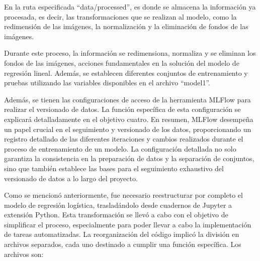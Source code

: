 En la ruta especificada ``data/processed'', es donde se almacena la información ya procesada, es decir, las transformaciones que se realizan al modelo, como la redimensión de las imágenes, la normalización y la eliminación de fondos de las imágenes.

\newpage

Durante este proceso, la información se redimensiona, normaliza y se eliminan los fondos de las imágenes, acciones fundamentales en la solución del modelo de regresión lineal. Además, se establecen diferentes conjuntos de entrenamiento y pruebas utilizando las variables disponibles en el archivo ``model1''. \newline

Además, se tienen las configuraciones de acceso de la herramienta MLFlow para realizar el versionado de datos. La función específica de esta configuración se explicará detalladamente en el objetivo cuatro. En resumen, MLFlow desempeña un papel crucial en el seguimiento y versionado de los datos, proporcionando un registro detallado de las diferentes iteraciones y cambios realizados durante el proceso de entrenamiento de un modelo. La configuración detallada no solo garantiza la consistencia en la preparación de datos y la separación de conjuntos, sino que también establece las bases para el seguimiento exhaustivo del versionado de datos a lo largo del proyecto. \newline

Como se mencionó anteriormente, fue necesario reestructurar por completo el modelo de regresión logística, trasladándolo desde cuadernos de Jupyter a extensión Python. Esta transformación se llevó a cabo con el objetivo de simplificar el proceso, especialmente para poder llevar a cabo la implementación de tareas automatizadas. La reorganización del código implicó la división en archivos separados, cada uno destinado a cumplir una función específica. Los archivos son: \newline

